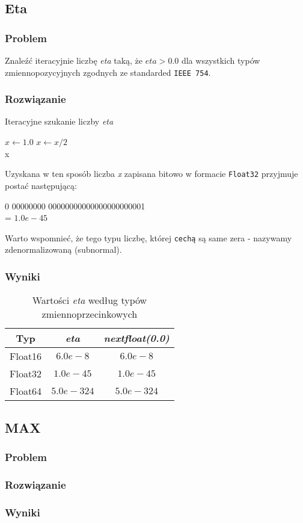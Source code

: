 \documentclass{article}
\begin{document}
    \subsection{Eta}
    \subsubsection{Problem}
        Znaleźć iteracyjnie liczbę \textit{eta} taką, że $eta > 0.0$ dla wszystkich typów zmiennopozycyjnych zgodnych ze standarded \texttt{IEEE 754}.
        \subsubsection{Rozwiązanie}
        \begin{algorithm}
        \caption{Iteracyjne szukanie liczby \textit{eta}}
        \begin{algorithmic}[1]
        \State $x\gets 1.0$
            \State $x\gets x / 2$
        \EndWhile \\
        \Return x
        \end{algorithmic}
        \end{algorithm}
        Uzyskana w ten sposób liczba \textit{x} zapisana bitowo w formacie \texttt{Float32} przyjmuje postać następującą:
        \begin{center}
            0 00000000 00000000000000000000001 \\
            = $1.0e-45$
        \end{center}
        Warto wspomnieć, że tego typu liczbę, której \texttt{cechą} są same zera - nazywamy zdenormalizowaną (subnormal).
    \subsubsection{Wyniki}
        {\small
        \begin{table}[h!]
        \centering
        \begin{tabular}{c c c}
            \hline
             Typ & \textit{eta} & \textit{nextfloat(0.0)} \\
             \hline
             Float16 & $6.0e-8$ & $6.0e-8$ \\
             Float32 & $1.0e-45$ & $1.0e-45$\\
             Float64 & $5.0e-324$ & $5.0e-324$\\
             \hline
        \end{tabular}
        \caption{Wartości \textit{eta} według typów zmiennoprzecinkowych}
        \end{table}
        }
    
    \subsection{MAX}
    \subsubsection{Problem}
    \subsubsection{Rozwiązanie}
    \subsubsection{Wyniki}
\end{document}
